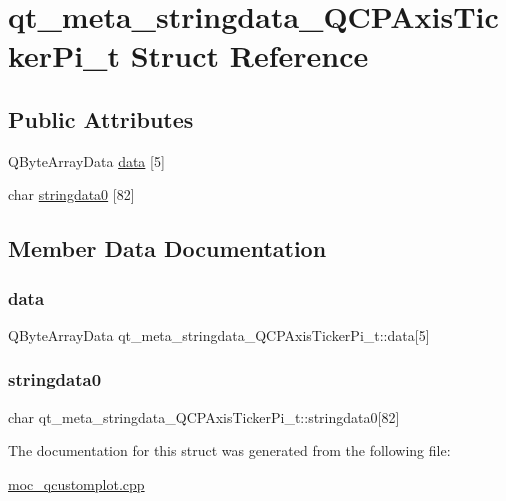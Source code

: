 \hypertarget{structqt__meta__stringdata__QCPAxisTickerPi__t}{}\section{qt\+\_\+meta\+\_\+stringdata\+\_\+\+Q\+C\+P\+Axis\+Ticker\+Pi\+\_\+t Struct Reference}
\label{structqt__meta__stringdata__QCPAxisTickerPi__t}
\subsection*{Public Attributes}
\begin{DoxyCompactItemize}
\item 
Q\+Byte\+Array\+Data \mbox{\hyperlink{structqt__meta__stringdata__QCPAxisTickerPi__t_a9f99bf64eee1204b7290801f16f2f970}{data}} \mbox{[}5\mbox{]}
\item 
char \mbox{\hyperlink{structqt__meta__stringdata__QCPAxisTickerPi__t_a09df8d6e526c01eb8d476aad32b2ab37}{stringdata0}} \mbox{[}82\mbox{]}
\end{DoxyCompactItemize}


\subsection{Member Data Documentation}
\mbox{\label{structqt__meta__stringdata__QCPAxisTickerPi__t_a9f99bf64eee1204b7290801f16f2f970}} 
\subsubsection{\texorpdfstring{data}{data}}
{\footnotesize\ttfamily Q\+Byte\+Array\+Data qt\+\_\+meta\+\_\+stringdata\+\_\+\+Q\+C\+P\+Axis\+Ticker\+Pi\+\_\+t\+::data\mbox{[}5\mbox{]}}

\mbox{\label{structqt__meta__stringdata__QCPAxisTickerPi__t_a09df8d6e526c01eb8d476aad32b2ab37}} 
\subsubsection{\texorpdfstring{stringdata0}{stringdata0}}
{\footnotesize\ttfamily char qt\+\_\+meta\+\_\+stringdata\+\_\+\+Q\+C\+P\+Axis\+Ticker\+Pi\+\_\+t\+::stringdata0\mbox{[}82\mbox{]}}



The documentation for this struct was generated from the following file\+:\begin{DoxyCompactItemize}
\item 
\mbox{\hyperlink{moc__qcustomplot_8cpp}{moc\+\_\+qcustomplot.\+cpp}}\end{DoxyCompactItemize}
